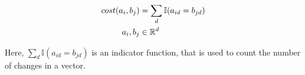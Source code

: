 \documentclass[./../../paper.tex]{subfiles}
\begin{document}
\begin{align}
    \label{eq:sparcity}                          
    cost(a_i, b_j)      & = \sum_d \mathbb{I}(a_{id} = b_{jd}) \\
    a_i,b_j        & \in \mathbb{R}^d
\end{align}

\noindent Here, $\sum_d \mathbb{I}(a_{id} = b_{jd})$ is an indicator function, that is used to count the number of changes in a vector.




\end{document}
